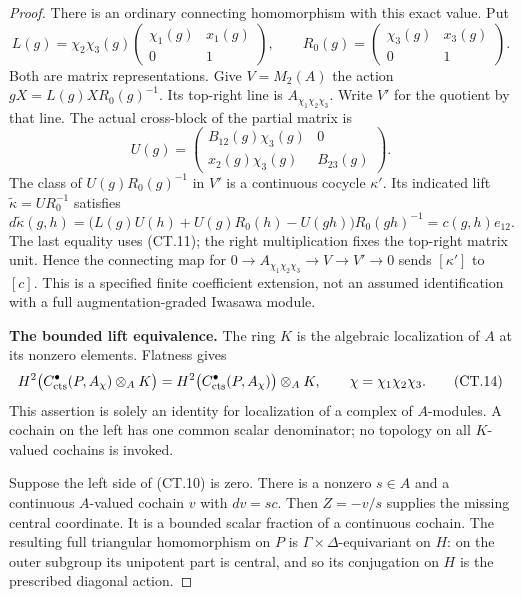 \begin{proof}
There is an ordinary connecting homomorphism with this exact value.
Put
\[
 L(g)=\chi_2\chi_3(g)
       \begin{pmatrix}\chi_1(g)&x_1(g)\\0&1\end{pmatrix},
 \qquad
 R_0(g)=\begin{pmatrix}\chi_3(g)&x_3(g)\\0&1\end{pmatrix}.
\]
Both are matrix representations. Give \(V=M_2(A)\) the action
\(gX=L(g)X R_0(g)^{-1}\). Its top-right line is
\(A_{\chi_1\chi_2\chi_3}\). Write \(V'\) for the quotient
by that line. The actual cross-block of the partial matrix is
\[
 U(g)=\begin{pmatrix}
             B_{12}(g)\chi_3(g)&0\\
             x_2(g)\chi_3(g)&B_{23}(g)
       \end{pmatrix}.
\]
The class of \(U(g)R_0(g)^{-1}\) in \(V'\) is a
continuous cocycle \(\kappa'\). Its indicated lift
\(\widetilde\kappa=UR_0^{-1}\) satisfies
\[
 d\widetilde\kappa(g,h)
  =\bigl(L(g)U(h)+U(g)R_0(h)-U(gh)\bigr)R_0(gh)^{-1}
  =c(g,h)e_{12}.
 \tag{CT.13}
\]
The last equality uses (CT.11); the right multiplication fixes the
top-right matrix unit. Hence the connecting map for
\(0\to A_{\chi_1\chi_2\chi_3}\to V\to V'\to0\)
sends \([\kappa']\) to \([c]\). This is a specified finite
coefficient extension, not an assumed identification with a full
augmentation-graded Iwasawa module.

\par\medskip\noindent\textbf{The bounded lift equivalence.}
The ring \(K\) is the algebraic localization of \(A\) at its
nonzero elements. Flatness gives
\[
 H^2\bigl(C^\bullet_{\rm cts}(P,A_\chi)\otimes_A K\bigr)
   =H^2\bigl(C^\bullet_{\rm cts}(P,A_\chi)\bigr)\otimes_A K,
 \qquad \chi=\chi_1\chi_2\chi_3.
 \tag{CT.14}
\]
This assertion is solely an identity for localization of a complex
of \(A\)-modules. A cochain on the left has one common scalar
denominator; no topology on all \(K\)-valued cochains is invoked.

Suppose the left side of (CT.10) is zero. There is a nonzero
\(s\in A\) and a continuous \(A\)-valued cochain \(v\) with
\(dv=sc\). Then \(Z=-v/s\) supplies the missing central
coordinate. It is a bounded scalar fraction of a continuous cochain.
The resulting full triangular homomorphism on \(P\) is
\(\Gamma\times\Delta\)-equivariant on \(H\): on the outer
subgroup its unipotent part is central, and so its conjugation on
\(H\) is the prescribed diagonal action.


\end{proof}
